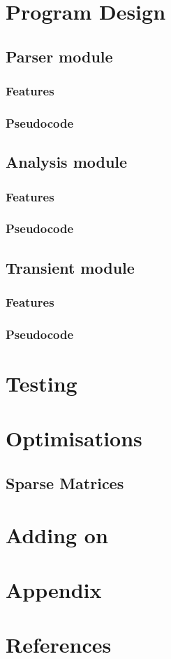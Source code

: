 \documentclass[12pt,a4paper]{article}
\begin{document}
\section{Program Design}
\pagebreak
	\subsection{Parser module}
	\pagebreak
	\subsubsection{Features}
	\pagebreak
	\subsubsection{Pseudocode}
	\pagebreak

	\subsection{Analysis module}
	\pagebreak
	\subsubsection{Features}
	\pagebreak
	\subsubsection{Pseudocode}
	\pagebreak

	\subsection{Transient module}
	\pagebreak
		\subsubsection{Features}
		\pagebreak
		\subsubsection{Pseudocode}
		\pagebreak

\section{Testing}
\pagebreak

\section{Optimisations}
\subsection{Sparse Matrices}
\pagebreak

\section{Adding on}
\pagebreak

\section{Appendix}
\pagebreak

\section{References}
\printbibliography[title={References}]
\end{document}
